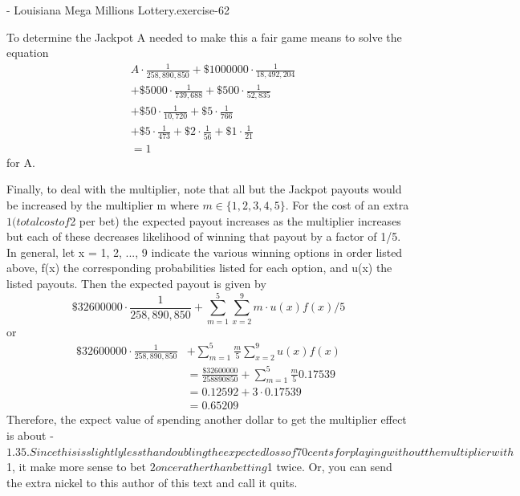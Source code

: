 \documentclass[10pt,]{book}
\numberwithin{equation}{section}
\begin{document}
\begin{inlineexercise}{- Louisiana Mega Millions Lottery.}{exercise-62}
\par
\hypertarget{p-879}{}%
To determine the Jackpot A needed to make this a fair game means to solve the equation%
\begin{align*}
& A \cdot \frac{1}{258,890,850} + \$1000000 \cdot \frac{1}{18,492,204} \\
& + \$5000 \cdot \frac{1}{739,688} + \$500 \cdot \frac{1}{52,835}\\
& + \$50 \cdot \frac{1}{10,720} + \$5 \cdot \frac{1}{766} \\
& + \$5 \cdot \frac{1}{473} + \$2 \cdot \frac{1}{56} + \$1 \cdot \frac{1}{21}\\
& = 1
\end{align*}
for A.%
\par
\hypertarget{p-880}{}%
Finally, to deal with the multiplier, note that all but the Jackpot payouts would be increased by the multiplier m where \(m \in \{1,2,3,4,5\}\).  For the cost of an extra $1 (total cost of $2 per bet) the expected payout increases as the multiplier increases but each of these decreases likelihood of winning that payout by a factor of 1/5.  In general, let x = 1, 2, ..., 9 indicate the various winning options in order listed above, f(x) the corresponding probabilities listed for each option, and  u(x) the listed payouts. Then the expected payout is given by%
\begin{equation*}
\$32600000 \cdot \frac{1}{258,890,850} + \sum_{m=1}^5
\sum_{x=2}^9 m \cdot u(x) f(x)/5 
\end{equation*}
or%
\begin{align*}
\$32600000 \cdot \frac{1}{258,890,850} & + \sum_{m=1}^5 \frac{m}{5} \sum_{x=2}^9 u(x) f(x) \\
& = \frac{\$32600000}{258890850} + \sum_{m=1}^5 \frac{m}{5} 0.17539\\
& = 0.12592 + 3 \cdot 0.17539\\
& = 0.65209
\end{align*}
Therefore, the expect value of spending another dollar to get the multiplier effect is about -$1.35.  Since this is slightly less than doubling the expected loss of 70 cents for playing without the multiplier with $1, it make more sense to bet $2 once rather than betting $1 twice.  Or, you can send the extra nickel to this author of this text and call it quits.%
\end{inlineexercise}
%
%
%
\typeout{************************************************}
\typeout{************************************************}
%
\end{document}
